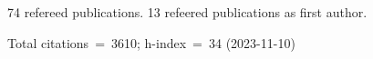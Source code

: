 74 refereed publications. 13 refeered publications as first author.

Total citations~=~3610; h-index~=~34 (2023-11-10)